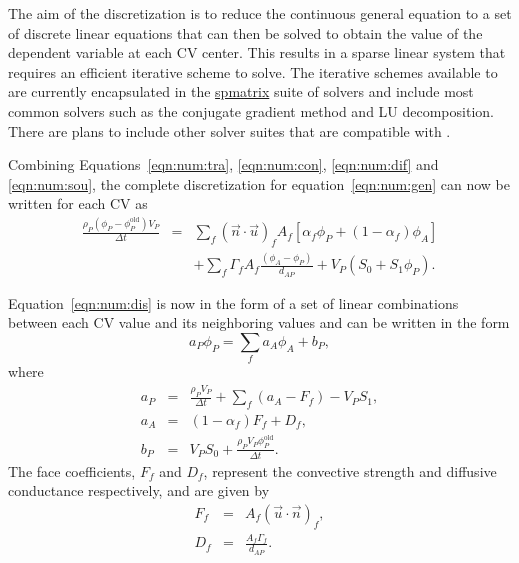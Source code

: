 The aim of the discretization is to reduce the continuous general
equation to a set of discrete linear equations that can then be solved
to obtain the value of the dependent variable at each CV center. This
results in a sparse linear system that requires an efficient iterative
scheme to solve. The iterative schemes available to \FiPy{} are
currently encapsulated in the \href{#id5}{spmatrix} suite of solvers
and include most common solvers such as the conjugate gradient method
and LU decomposition. There are plans to include other solver suites
that are compatible with \Python{}.

Combining Equations~\eqref{eqn:num:tra}, \eqref{eqn:num:con},
\eqref{eqn:num:dif} and \eqref{eqn:num:sou}, the complete
discretization for equation~\eqref{eqn:num:gen} can now be written for
each CV as
\begin{eqnarray}
\frac{\rho_{P}(\phi_{P} - \phi_P^\text{old}) V_P}{\Delta t}
&=&
\sum_{f} (\vec{n} \cdot \vec{u})_f A_f 
\left[\alpha_f \phi_P +\left(1-\alpha_f\right)\phi_A\right]
\nonumber \\
&&+
\sum_f \Gamma_f A_f \frac{(\phi_A-\phi_P)}{d_{AP}}
+ 
V_P ( S_0 + S_1 \phi_P ).
\label{eqn:num:dis}
\end{eqnarray}

Equation~\eqref{eqn:num:dis} is now in the form of a set of linear
combinations between each CV value and its neighboring values and can be
written in the form
\begin{equation}
a_P \phi_P = \sum_f a_{A} \phi_{A} + b_P,
\label{eqn:num:dap}
\end{equation}
where
\begin{eqnarray}
a_P & = & \frac{\rho_P V_P}{\Delta t} + \sum_f (a_{A} -
F_f) - V_P S_1, \\
a_{A} & = & ( 1 - \alpha_f ) F_f + D_f, \\
b_P & = & V_P S_0 + \frac{\rho_P V_P \phi_P^\text{old}}{\Delta t}.
\end{eqnarray}
The face coefficients, $F_f$ and $D_f$, represent the convective strength
and diffusive conductance respectively, and are given by
\begin{eqnarray}
F_f & = & A_f ( \vec{u} \cdot \vec{n} )_f, \\
D_f & = & \frac{A_f \Gamma_f}{d_{AP}} .
\end{eqnarray}












